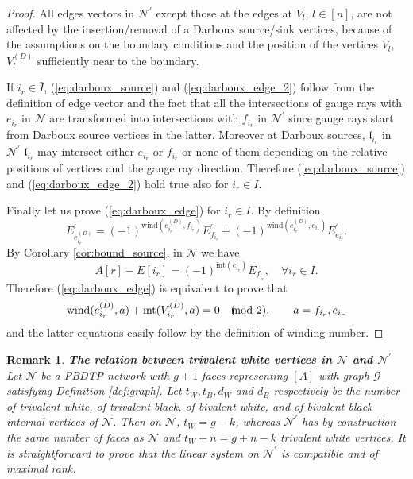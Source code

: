 \documentclass[11pt]{amsart}
\theoremstyle{plain}
\numberwithin{equation}{section}
\newtheorem{remark}{Remark}[subsection]
\begin{document}
\begin{proof}
All edges vectors in $\mathcal N^{\prime}$ except those at the edges at $V_l$, $l\in [n]$, are not affected by the insertion/removal of a Darboux source/sink vertices, because of the assumptions on the boundary conditions and the position of the vertices 
$V_l$, $V^{(D)}_l$ sufficiently near to the boundary. 

If $i_r \in \bar I$, (\ref{eq:darboux_source}) and (\ref{eq:darboux_edge_2}) follow from the definition of edge vector and the fact that all the intersections of gauge rays with $e_{i_r}$ in $\mathcal N$ are transformed into intersections with $f_{i_r}$ in $\mathcal N^{\prime}$ since gauge rays start from Darboux source vertices in the latter. Moreover at Darboux sources, $\mathfrak{l}_{i_r}$ in $\mathcal N^{\prime}$ $\mathfrak{l}_{i_r}$ may intersect either $e_{i_r}$ or $f_{i_r}$ or none of them depending on the relative positions of vertices and the gauge ray direction. Therefore (\ref{eq:darboux_source}) and (\ref{eq:darboux_edge_2})
hold true also for $i_r\in I$. 

Finally let us prove (\ref{eq:darboux_edge}) for $i_r\in I$. By definition
\[
E_{e_{i_r}^{(D)}}^{\prime} = (-1)^{\mbox{wind}(e_{i_r}^{(D)}, f_{i_r})} E_{f_{i_r}}^{\prime} + (-1)^{\mbox{wind}(e_{i_r}^{(D)},e_{i_r})} E_{ e_{i_r}}^{\prime}.
\]
By Corollary \ref{cor:bound_source}, in $\mathcal N$ we have
\[
A[r]-E[i_r] = (-1)^{\mbox{int}(e_{i_r})} E_{f_{i_r}}, \quad \forall i_r \in I.
\]
Therefore (\ref{eq:darboux_edge}) is equivalent to prove that
\[
\mbox{wind}(e_{i_r}^{(D)}, a) + \mbox{int}(V^{(D)}_{i_r},a) =0 \quad (\!\!\!\!\!\!\mod 2),  \quad\quad a=f_{i_r},e_{i_r}\\
\]
and the latter equations easily follow by the definition of winding number. 
\end{proof}

\begin{remark}\label{rem:genusGN}\textbf{The relation between trivalent white vertices in ${\mathcal N}$ and ${\mathcal N}^{\prime}$}	
Let ${\mathcal N}$ be a PBDTP network with $g+1$ faces representing $[A]$ with graph $\mathcal G$ satisfying Definition \ref{def:graph}. Let $t_W, t_B, d_W$ and $d_B$ respectively be the number of trivalent white, of trivalent black, of bivalent white, and of bivalent black internal vertices of ${\mathcal N}$. Then on $\mathcal N$,
$t_W = g-k$, whereas
${\mathcal N}^{\prime}$ has by construction the same number of faces as $\mathcal N$ and $t_W+n=g+n-k$ trivalent white vertices.
It is straightforward to prove that the linear system on $\mathcal N^{\prime}$ is compatible and of maximal rank.  
\end{remark}
\end{document}
